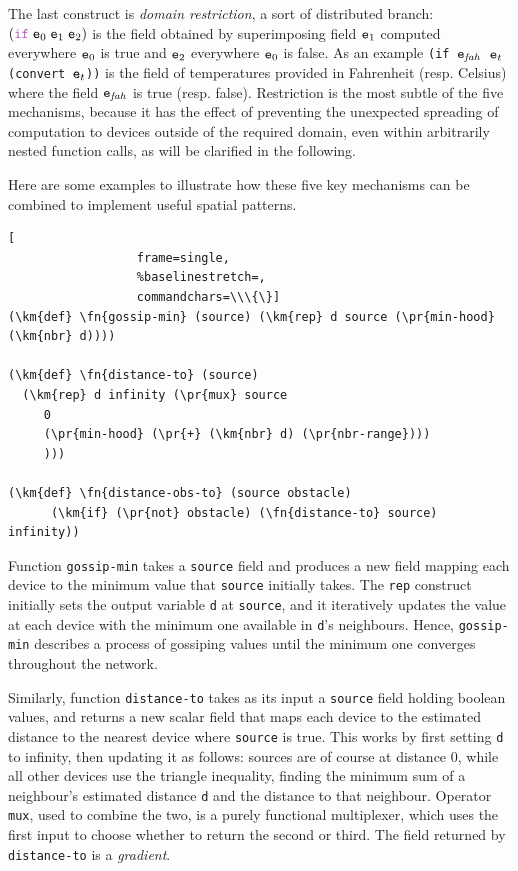 \documentclass[12pt,a4paper,twoside,openright]{book}
\begin{document}
The last construct is \emph{domain restriction}, a sort of distributed branch: $(\ifN \; \e_0\; \e_1 \; \e_2)$ is the field obtained by superimposing field $\texttt{e}_1$ computed everywhere $\texttt{e}_0$ is true and $\texttt{e}_2$ everywhere $\texttt{e}_0$ is false.
%
As an example \mbox{\texttt{(if $\texttt{e}_{\mathit{fah}}$ $\texttt{e}_t$ (convert $\texttt{e}_t$))}} is the field of temperatures provided in Fahrenheit (resp. Celsius) where the field $\texttt{e}_{\mathit{fah}}$ is true (resp. false).
%
Restriction is the most subtle of the five mechanisms, because it has the effect of preventing the unexpected spreading of computation to devices outside of the required domain, even within arbitrarily nested function calls, as will be clarified in the following.

Here are some examples to illustrate how these five key mechanisms can be combined to implement useful spatial patterns.
%
\begin{samepage}
\begin{Verbatim}[
                  frame=single,
                  %baselinestretch=,
                  commandchars=\\\{\}]
(\km{def} \fn{gossip-min} (source) (\km{rep} d source (\pr{min-hood} (\km{nbr} d))))

(\km{def} \fn{distance-to} (source)
  (\km{rep} d infinity (\pr{mux} source
     0
     (\pr{min-hood} (\pr{+} (\km{nbr} d) (\pr{nbr-range})))
     )))

(\km{def} \fn{distance-obs-to} (source obstacle)
      (\km{if} (\pr{not} obstacle) (\fn{distance-to} source) infinity))
\end{Verbatim}
\end{samepage}
%
Function {\tt gossip-min} takes a {\tt source} field and produces a new field mapping each device to the minimum value that {\tt source} initially takes.
%
The {\tt rep} construct initially sets the output variable {\tt d} at {\tt source}, and it iteratively updates the value at each device with the minimum one available in {\tt d}'s neighbours.
%
Hence, {\tt gossip-min} describes a process of gossiping values until the minimum one converges throughout the network.

Similarly, function {\tt distance-to} takes as its input a {\tt source} field holding boolean values, and returns a new scalar field that maps each device to the estimated distance to the nearest device where {\tt source} is true.
%
This works by first setting {\tt d} to infinity, then updating it as follows: sources are of course at distance $0$, while all other devices use the triangle inequality, finding the minimum sum of a neighbour's estimated distance {\tt d} and the distance to that neighbour.
%
Operator \texttt{mux}, used to combine the two, is a purely functional multiplexer, which uses the first input to choose whether to return the second or third.
%
The field returned by {\tt distance-to} is a \emph{gradient}.
\end{document}
